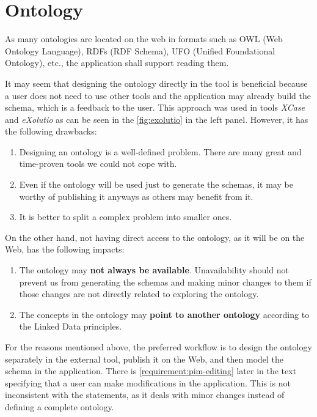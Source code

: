 \section{Ontology}

\begin{requirement}
    \label{requirement:ontologies-on-the-web}
    As many ontologies are located on the web in formats such as OWL (Web Ontology Language), RDFs (RDF Schema), UFO (Unified Foundational Ontology), etc., the application shall support reading them.
\end{requirement}

It may seem that designing the ontology directly in the tool is beneficial because a user does not need to use other tools and the application may already build the schema, which is a feedback to the user. This approach was used in tools \textit{XCase} and \textit{eXolutio} as can be seen in the \autoref{fig:exolutio} in the left panel. However, it has the following drawbacks:

\begin{enumerate}
    \item Designing an ontology is a well-defined problem. There are many great and time-proven tools we could not cope with.
    \item Even if the ontology will be used just to generate the schemas, it may be worthy of publishing it anyways as others may benefit from it.
    \item It is better to split a complex problem into smaller ones.
\end{enumerate}

On the other hand, not having direct access to the ontology, as it will be on the Web, has the following impacts:

\begin{enumerate}
    \item The ontology may \textbf{not always be available}. Unavailability should not prevent us from generating the schemas and making minor changes to them if those changes are not directly related to exploring the ontology.
    \item The concepts in the ontology may \textbf{point to another ontology} according to the Linked Data principles.
\end{enumerate}

For the reasons mentioned above, the preferred workflow is to design the ontology separately in the external tool, publish it on the Web, and then model the schema in the application. There is \autoref{requirement:pim-editing} later in the text specifying that a user can make modifications in the application. This is not inconsistent with the statements, as it deals with minor changes instead of defining a complete ontology.

